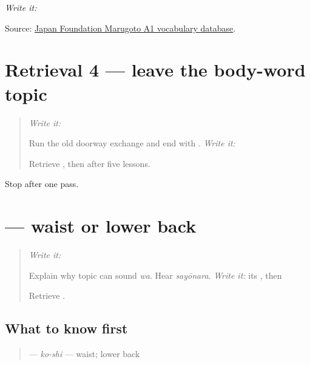 \emph{Write it:} \textbf{}

\begin{tcolorbox}[breakable,colback=teal!4,colframe=teal!35!black,title={Before you move on}]
Source: \href{https://words.marugotoweb.jp/}{Japan Foundation Marugoto A1 vocabulary database}.
\end{tcolorbox}
\section[Practice]{Retrieval 4 — leave the body-word topic}

\label{lesson:JA-R12-doorway}



\begin{quote}
\emph{Write it:} \textbf{}

Run the old doorway exchange and end with \textbf{}. \emph{Write it:} \textbf{}

Retrieve \textbf{}, then \textbf{} after five lessons.
\end{quote}

\begin{tcolorbox}[breakable,colback=teal!4,colframe=teal!35!black,title={Before you move on}]
Stop after one pass.
\end{tcolorbox}
\section[\texorpdfstring{\ja{こし} (koshi)}{こし (koshi)}]{ — waist or lower back}

\label{lesson:JA-C12-koshi}



\begin{quote}
\emph{Write it:} \textbf{}

Explain why topic \textbf{} can sound \emph{wa}. Hear \emph{sayōnara}. \emph{Write it:} its \textbf{}, then \textbf{}

Retrieve \textbf{}.
\end{quote}

\subsection*{What to know first}
\begin{quote}
\textbf{} — \emph{ko-shi} — waist; lower back
\end{quote}

